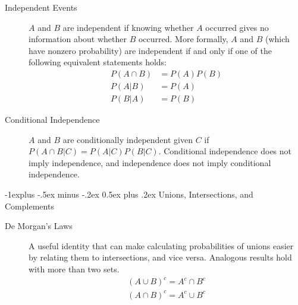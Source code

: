 \documentclass[6pt,landscape]{article}
\makeatletter
\renewcommand{\subsection}{\@startsection{subsection}{2}{0mm}%
                                {-1explus -.5ex minus -.2ex}%
                                {0.5ex plus .2ex}%
                                {\normalfont\normalsize\bfseries}}
\makeatother
\begin{document}
\begin{multicols*}{3}
    \begin{description}
        \item[Independent Events] $A$ and $B$ are independent if knowing whether $A$ occurred gives no information about whether $B$ occurred. More formally, $A$ and $B$ (which have nonzero probability) are independent if and only if one of the following equivalent statements holds: 
           \begin{align*} 
            P({A}\cap { B}) &= P({A})P({B}) \\
            P({ A}|{ B}) &= P({A})\\
            P(B|A) &= P(B)
           \end{align*}
        \item[Conditional Independence]  ${A}$ and ${B}$ are conditionally independent given ${C}$ if $P({A}\cap {B}|{C}) = P({A}|{C})P({B}|{C})$. Conditional independence does not imply independence, and independence does not imply conditional independence.
    \end{description}
    
\subsection{Unions, Intersections, and Complements}

    \begin{description}

        \item[De Morgan's Laws] A useful identity that can make calculating probabilities of unions easier by relating them to intersections, and vice versa. Analogous results hold with more than two sets.
           \begin{align*} 
        ({A} \cup { B})^c = {A^c} \cap { B^c} \\
        ({A} \cap {B})^c = { A^c} \cup { B^c}
           \end{align*} 
                  


\end{description}
\end{multicols*}
\end{document}
